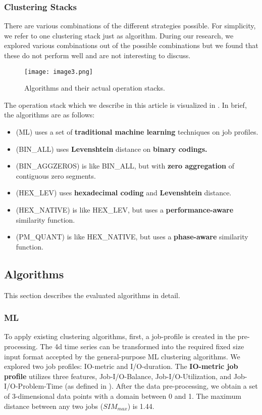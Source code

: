 \documentclass{jhps}
\begin{document}
\subsubsection{Clustering Stacks}
There are various combinations of the different strategies possible.
For simplicity, we refer to one clustering stack just as algorithm.
During our research, we explored various combinations out of the possible combinations but we found that these do not perform well and are not interesting to discuss.

\begin{figure}
  \centering
  \texttt{[image: image3.png]}
  \caption{Algorithms and their actual operation stacks.}
  \label{fig:clustering_stacks}
\end{figure}



The operation stack which we describe in this article is visualized in .
In brief, the algorithms are as follows:
\begin{itemize}
 \item (ML) uses a set of \textbf{traditional machine learning} techniques on job profiles.
 \item (BIN\_ALL) uses \textbf{Levenshtein} distance on \textbf{binary codings.}
 \item (BIN\_AGGZEROS) is like BIN\_ALL, but with \textbf{zero aggregation} of contiguous zero segments.
 \item (HEX\_LEV) uses \textbf{hexadecimal coding} and \textbf{Levenshtein} distance.
 \item (HEX\_NATIVE) is like HEX\_LEV, but uses a \textbf{performance-aware} similarity function.
 \item (PM\_QUANT) is like HEX\_NATIVE, but uses a \textbf{phase-aware} similarity function.
\end{itemize}

\subsection{Algorithms}
This section describes the evaluated algorithms in detail.

\subsubsection{ML}

To apply existing clustering algorithms, first, a job-profile is created in the pre-processing.
The 4d time series can be transformed into the required fixed size input format accepted by the general-purpose ML clustering algorithms.
We explored two job profiles: IO-metric and I/O-duration.
The \textbf{IO-metric job profile} utilizes three features, Job-I/O-Balance, Job-I/O-Utilization, and Job-I/O-Problem-Time (as defined in \cite{iocats2020}).
After the data pre-processing, we obtain a set of 3-dimensional data points with a domain between 0 and 1.
The maximum distance between any two jobs ($SIM_{max}$) is 1.44.
\end{document}
